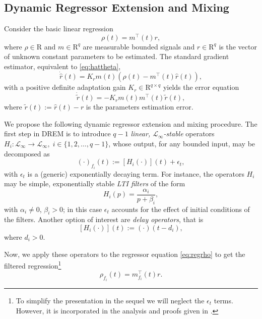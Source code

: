 \documentclass[journal, onecolumn]{IEEEtran}
\newcommand{\rea}{\mathrm{R}}
\begin{document}
\subsection{Dynamic Regressor Extension and Mixing}
 Consider the basic linear regression 
\begin{equation}\label{eq:regrho}
	\rho(t) = m^\top(t)r,
\end{equation}
where $\rho\in\rea$ and $m \in \rea^q$ are measurable bounded signals and $r\in\rea^q$ is the vector of unknown constant parameters to be estimated. The standard gradient estimator, equivalent to \eqref{eq:hattheta},
\begin{equation*}
	\dot {\hat r}(t)=K_r m(t) (\rho(t) - m^\top(t) \hat{r}(t)),
\end{equation*}
with a positive definite adaptation gain $K_r \in \rea^{q \times q}$ yields the error equation
\begin{equation}  \label{eq:tilder}
	\dot {\tilde r}(t)=-K_r m(t) m^\top(t) \tilde r(t),
\end{equation}
where $\tilde{r}(t) := \hat{r}(t)-r$ is the parameters estimation error.

We propose the following dynamic regressor extension and mixing procedure. The first step in DREM is to introduce $q-1$ {\em linear, $\mathcal{L}_\infty$-stable} operators $H_i: \mathcal{L}_\infty \to \mathcal{L}_\infty,\;i \in \{1,2,\dots,q-1\}$, whose output, for any bounded input, may be decomposed as
\begin{equation*} \label{eq:H}
	(\cdot)_{f_i}(t):=[H_i(\cdot)](t) + \epsilon_t,
\end{equation*}
with $\epsilon_t$ is a (generic) exponentially decaying term. For instance, the operators $H_i$ may be simple, exponentially stable {\em LTI filters} of the form
\begin{equation*}
	H_i(p)=\frac{\alpha_i}{p + \beta_i},
\end{equation*}
with $\alpha_i\ne 0$, $\beta_i>0$; in this case $\epsilon_t$ accounts for the effect of initial conditions of the filters. Another option of interest are {\em delay operators}, that is
\[
	[H_i(\cdot)](t):=(\cdot)(t-d_i),
\]
where $d_i>0$.

Now, we apply these operators to the regressor equation \eqref{eq:regrho} to get the filtered regression\footnote{To simplify the presentation in the sequel we will neglect the $\epsilon_t$ terms. However, it is incorporated in the analysis and proofs given in \cite{Aranovskiy2015DREM}.}
\begin{equation*}
	\rho_{f_i}(t)= m^\top_{f_i}(t) r.
\end{equation*}
\end{document}
